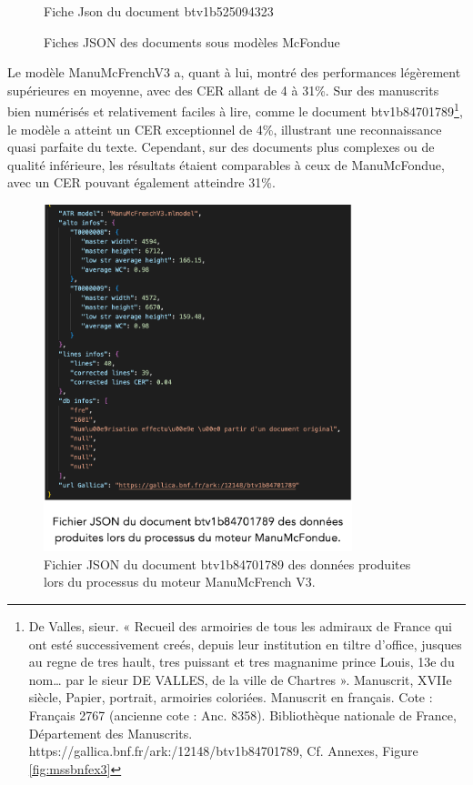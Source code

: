 \documentclass[a4paper,12pt,twoside]{book}
\begin{document}
\begin{figure}[h!]
\begin{minipage}{0.45\textwidth}
			\caption{Fiche Json du document btv1b525094323 }
			\label{fig:image2}
		\end{minipage}
		\caption{Fiches JSON des documents sous modèles McFondue}
		\label{fig:images_cote_a_cote}
	\end{figure}
	
	Le modèle ManuMcFrenchV3 a, quant à lui, montré des performances légèrement supérieures en moyenne, avec des CER allant de 4 à 31\%. Sur des manuscrits bien numérisés et relativement faciles à lire, comme le document btv1b84701789\footnote{De Valles, sieur. « Recueil des armoiries de tous les admiraux de France qui ont esté successivement creés, depuis leur institution en tiltre d’office, jusques au regne de tres hault, tres puissant et tres magnanime prince Louis, 13e du nom… par le sieur DE VALLES, de la ville de Chartres ». Manuscrit, XVIIe siècle, Papier, portrait, armoiries coloriées. Manuscrit en français. Cote : Français 2767 (ancienne cote : Anc. 8358). Bibliothèque nationale de France, Département des Manuscrits.  https://gallica.bnf.fr/ark:/12148/btv1b84701789, Cf. Annexes, Figure \ref{fig:mssbnfex3}}, le modèle a atteint un CER exceptionnel de 4\%, illustrant une reconnaissance quasi parfaite du texte. Cependant, sur des documents plus complexes ou de qualité inférieure, les résultats étaient comparables à ceux de ManuMcFondue, avec un CER pouvant également atteindre 31\%.
	\\
	\begin{figure}[h!]
		\centering
		\includegraphics[width=0.8\textwidth]{images/fiche_json_b.png}
		\caption{Fichier JSON du document btv1b84701789 des données produites lors du processus du moteur ManuMcFrench V3.}
		\label{fig:monimage}
	\end{figure}
	
\end{document}
